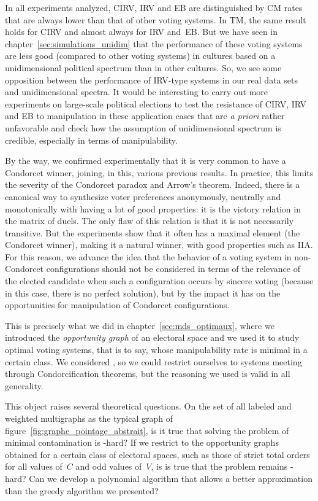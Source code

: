 In all experiments analyzed, CIRV, IRV and EB are distinguished by CM rates that are always lower than that of other voting systems. In TM, the same result holds for CIRV and almost always for IRV and~EB. But we have seen in chapter~\ref{sec:simulations_unidim} that the performance of these voting systems are less good (compared to other voting systems) in cultures based on a unidimensional political spectrum than in other cultures.
So, we see some opposition between the performance of IRV-type systems in our real data sets and unidimensional spectra. It would be interesting to carry out more experiments on large-scale political elections to test the resistance of CIRV, IRV and EB to manipulation in these application cases that are \emph{a priori} rather unfavorable and check how the assumption of unidimensional spectrum is credible, especially in terms of manipulability.

By the way, we confirmed experimentally that it is very common to have a Condorcet winner, joining, in this, various previous results. In practice, this limits the severity of the Condorcet paradox and Arrow's theorem. Indeed, there is a canonical way to synthesize voter preferences anonymously, neutrally and monotonically with having a lot of good properties: it is the victory relation in the matrix of duels. The only flaw of this relation is that it is not necessarily transitive. But the experiments show that it often has a maximal element (the Condorcet winner), making it a natural winner, with good properties such as IIA. For this reason, we advance the idea that the behavior of a voting system in non-Condorcet configurations should not be considered in terms of the relevance of the elected candidate when such a configuration occurs by sincere voting (because in this case, there is no perfect solution), but by the impact it has on the opportunities for manipulation of Condorcet configurations.

\medskip
This is precisely what we did in chapter~\ref{sec:mds_optimaux}, where we introduced the \emph{opportunity graph} of an electoral space and we used it to study optimal voting systems, that is to say, whose manipulability rate is minimal in a certain class. We considered \cminf{}, so we could restrict ourselves to systems meeting \cond{} through Condorcification theorems, but the reasoning we used is valid in all generality.

This object raises several theoretical questions. On the set of all labeled and weighted multigraphs as the typical graph of figure~\ref{fig:graphe_pointage_abstrait}, is it true that solving the problem of minimal contamination is \complexNP-hard? If we restrict to the opportunity graphs obtained for a certain class of electoral spaces, such as those of strict total orders for all values of~$ C $ and odd values of~$ V $, is is true that the problem remains \complexNP-hard? Can we develop a polynomial algorithm that allows a better approximation than the greedy algorithm we presented?

